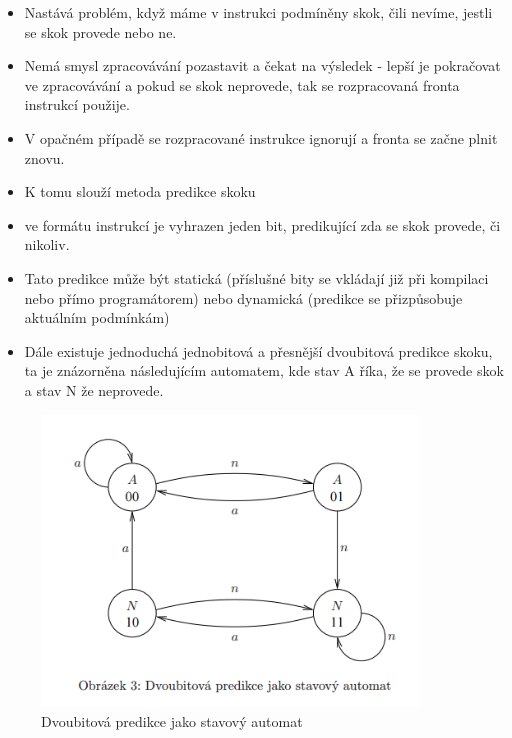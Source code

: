 \documentclass[10pt,a4paper]{article}
\begin{document}
\begin{itemize}
\item Nastává problém, když máme v instrukci podmíněny skok, čili nevíme, jestli se skok provede nebo ne.
\item Nemá smysl zpracovávání pozastavit a čekat na výsledek - lepší je pokračovat ve zpracovávání a pokud se skok neprovede, tak se rozpracovaná fronta instrukcí použije.
\item V opačném případě se rozpracované instrukce ignorují a fronta se začne plnit znovu.
\item K tomu slouží metoda predikce skoku
\item ve formátu instrukcí je vyhrazen jeden bit, predikující zda se skok provede, či nikoliv.
\item Tato predikce může být statická (příslušné bity se vkládají již při kompilaci nebo přímo programátorem) nebo dynamická (predikce se přizpůsobuje aktuálním podmínkám)
\item Dále existuje jednoduchá jednobitová a přesnější dvoubitová predikce skoku, ta je znázorněna následujícím automatem, kde stav A říka, že se provede skok a stav N že neprovede.
\end{itemize}
\begin{figure}[ht]
    \centering
    \includegraphics[width=10cm]{predikce.png}
    \caption{Dvoubitová predikce jako stavový automat}
    \label{fig:predikce}
\end{figure}
\end{document}
